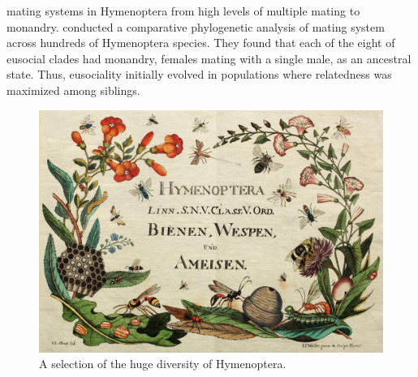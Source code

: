  mating systems in Hymenoptera from high levels of multiple mating to monandry. \citet{hughes2008ancestral} conducted a
comparative phylogenetic analysis of mating system across hundreds of Hymenoptera species. They found that each of the eight of
eusocial clades had monandry, females mating with a single male, as an ancestral
state. Thus, eusociality initially evolved in populations where
relatedness was maximized among siblings.
\begin{figure}
\begin{center}
\includegraphics[width= 0.75 \textwidth]{illustration_images/Quant_gen/Hymenoptera/Hymenoptera.jpg}
\end{center}
\caption{A selection of the huge diversity of  Hymenoptera.  } \label{Hymenoptera}
\end{figure}






